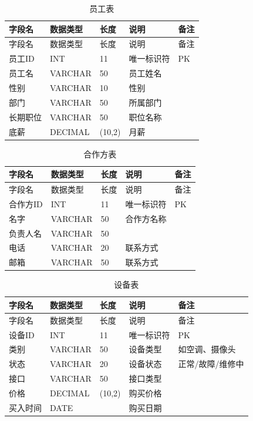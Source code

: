 \documentclass[]{article}
\begin{document}
\begin{longtable}[]{@{}lllll@{}}
\caption{员工表}\\
\toprule
字段名 & 数据类型 & 长度 & 说明 & 备注 \\
\midrule
\endfirsthead
\toprule
字段名 & 数据类型 & 长度 & 说明 & 备注 \\
\midrule
\endhead
员工ID & INT & 11 & 唯一标识符 & PK \\
员工名 & VARCHAR & 50 & 员工姓名 & \\
性别 & VARCHAR & 10 & 性别 & \\
部门 & VARCHAR & 50 & 所属部门 & \\
长期职位 & VARCHAR & 50 & 职位名称 & \\
底薪 & DECIMAL & (10,2) & 月薪 & \\
\bottomrule
\end{longtable}

\begin{longtable}[]{@{}lllll@{}}
\caption{合作方表}\\
\toprule
字段名 & 数据类型 & 长度 & 说明 & 备注 \\
\midrule
\endfirsthead
\toprule
字段名 & 数据类型 & 长度 & 说明 & 备注 \\
\midrule
\endhead
合作方ID & INT & 11 & 唯一标识符 & PK \\
名字 & VARCHAR & 50 & 合作方名称 & \\
负责人名 & VARCHAR & 50 &  & \\
电话 & VARCHAR & 20 & 联系方式 & \\
邮箱 & VARCHAR & 50 & 联系方式 & \\
\bottomrule
\end{longtable}

\begin{longtable}[]{@{}lllll@{}}
\caption{设备表}\\
\toprule
字段名 & 数据类型 & 长度 & 说明 & 备注 \\
\midrule
\endfirsthead
\toprule
字段名 & 数据类型 & 长度 & 说明 & 备注 \\
\midrule
\endhead
设备ID & INT & 11 & 唯一标识符 & PK \\
类别 & VARCHAR & 50 & 设备类型 & 如空调、摄像头 \\
状态 & VARCHAR & 20 & 设备状态 & 正常/故障/维修中 \\
接口 & VARCHAR & 50 & 接口类型 & \\
价格 & DECIMAL & (10,2) & 购买价格 & \\
买入时间 & DATE &  & 购买日期 & \\
\bottomrule
\end{longtable}
\end{document}
